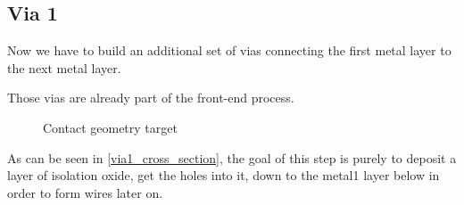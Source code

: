 \subsection{Via 1}\label{chapter_via1}

Now we have to build an additional set of vias connecting the first metal layer to the next metal layer.

Those vias are already part of the front-end process.

\begin{figure}[H]
	\centering
	\begin{tikzpicture}[node distance = 3cm, auto, thick,scale=\CrossSectionOnly, every node/.style={transform shape}]
		
	\end{tikzpicture}
	\caption{Contact geometry target}
	\label{via1_cross_section}
\end{figure}

As can be seen in \autoref{via1_cross_section}, the goal of this step is purely to deposit a layer of isolation oxide,
get the holes into it, down to the metal1 layer below in order to form wires later on.


